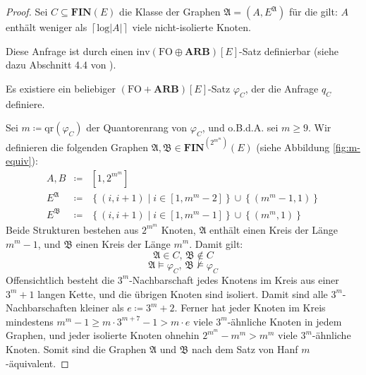 \begin{proof}
Sei $C\subseteq\mathbf{FIN}\left(E\right)$ die Klasse der Graphen
$\mathfrak{A}=\left(A,E^{\mathfrak{A}}\right)$ für die gilt: $A$
enthält weniger als $\left\lceil \mathrm{log}\left|A\right|\right\rceil $
viele nicht-isolierte Knoten.

Diese Anfrage ist durch einen $\mathrm{inv}\left(\mathrm{FO}\oplus\mathbf{ARB}\right)\left[E\right]$-Satz
definierbar (siehe dazu Abschnitt 4.4 von \cite{AMSS2012-locality}).

\begin{assumption*}
Es existiere ein beliebiger $\left(\mathrm{FO}+\mathbf{ARB}\right)\left[E\right]$-Satz
$\varphi_{C}$, der die Anfrage $q_{C}$ definiere.
\end{assumption*}
Sei $m\coloneqq\mathrm{qr}\left(\varphi_{C}\right)$ der Quantorenrang
von $\varphi_{C}$, und o.B.d.A. sei $m\geqslant9$. Wir definieren
die folgenden Graphen $\mathfrak{A},\mathfrak{B}\in\mathbf{FIN}^{\left(2^{m^{m}}\right)}\left(E\right)$
(siehe Abbildung \ref{fig:m-equiv}):
\begin{eqnarray*}
A,B & \coloneqq & \left[1,2^{m^{m}}\right]\\
E^{\mathfrak{A}} & \coloneqq & \left\{ \left(i,i+1\right)\mid i\in\left[1,m^{m}-2\right]\right\} \cup\left\{ \left(m^{m}-1,1\right)\right\} \\
E^{\mathfrak{B}} & \coloneqq & \left\{ \left(i,i+1\right)\mid i\in\left[1,m^{m}-1\right]\right\} \cup\left\{ \left(m^{m},1\right)\right\} 
\end{eqnarray*}
Beide Strukturen bestehen aus $2^{m^{m}}$ Knoten, $\mathfrak{A}$
enthält einen Kreis der Länge $m^{m}-1$, und $\mathfrak{B}$ einen
Kreis der Länge $m^{m}$. Damit gilt:
\[
\mathfrak{A}\in C,\,\mathfrak{B}\notin C
\]
\[
\mathfrak{A}\models\varphi_{C},\,\mathfrak{B}\not\models\varphi_{C}
\]
Offensichtlich besteht die $3^{m}$-Nachbarschaft jedes Knotens im
Kreis aus einer $3^{m}+1$ langen Kette, und die übrigen Knoten sind
isoliert. Damit sind alle $3^{m}$-Nachbarschaften kleiner als $e\coloneqq3^{m}+2$.
Ferner hat jeder Knoten im Kreis mindestens $m^{m}-1\geqslant m\cdot3^{m+7}-1>m\cdot e$
viele $3^{m}$-ähnliche Knoten in jedem Graphen, und jeder isolierte
Knoten ohnehin $2^{m^{m}}-m^{m}>m^{m}$ viele $3^{m}$-ähnliche Knoten.
Somit sind die Graphen $\mathfrak{A}$ und $\mathfrak{B}$ nach dem
Satz von Hanf $m$-äquivalent.


\end{proof}
